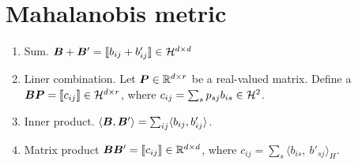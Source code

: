 \documentclass[12pt]{article}
\begin{document}
\section{Mahalanobis metric}

\begin{enumerate}
\item Sum. $\bm B+\bm B'=\llbracket b_{ij}+b'_{ij} \rrbracket\in\mathcal{H}^{d\times d}$
\item Liner combination. Let $\bm{P}\in\mathbb{R}^{d\times r}$ be a real-valued matrix. Define a $\bm B\bm{P}=\llbracket c_{ij} \rrbracket\in\mathcal{H}^{d\times r}$, where $c_{ij}=\sum_{s}p_{sj}b_{is} \in \mathcal{H}^2$.
\item Inner product. $\langle \bm B,\bm B'\rangle=\sum_{ij}\langle b_{ij}, b'_{ij}\rangle$.
\item Matrix product $\bm B\bm B'=\llbracket c_{ij} \rrbracket \in \mathbb{R}^{d\times d}$, where $c_{ij}=\sum_{s}\langle b_{is},\ b'_{sj}\rangle_H$. 
\end{enumerate}
\end{document}
